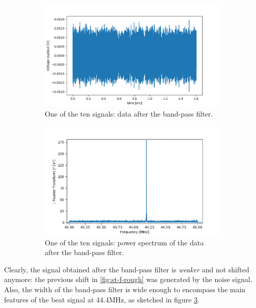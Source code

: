 \documentclass[10pt]{report}
\begin{document}
\begin{figure}[h!]
\centering
\begin{subfigure}{.48\textwidth}
  \centering
  \includegraphics[width=1.1\linewidth]{st-f-bpf}
  \caption{One of the ten signals: data after the band-pass filter.}
  \label{fig:st-f-bpf}
\end{subfigure}%
\hspace{1em}%
\begin{subfigure}{.48\textwidth}
  \centering
  \includegraphics[width=1.1\linewidth]{st-fft-bpf}
  \caption{One of the ten signals: power spectrum of the data after the band-pass filter.}
  \label{fig:st-fft-bpf}
\end{subfigure}
\caption{}
\end{figure}

Clearly, the signal obtained after the band-pass filter is \textit{weaker} and not shifted anymore: the previous shift in \ref{fig:st-f-rough} was generated by the noise signal. Also, the width of the band-pass filter is wide enough to encompass the main features of the beat signal at 44.4MHz, as sketched in figure \ref{fig:st-fft-bpf}.
\end{document}
